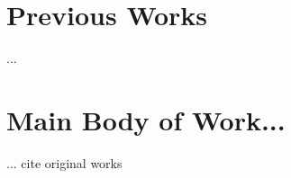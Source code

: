 \documentclass[12pt]{article}
\begin{document}
\section{Previous Works}
...

\section{Main Body of Work...}
... cite original works \cite{Original}


\newpage

\printbibliography[heading=bibintoc]

\newpage

\end{document}
